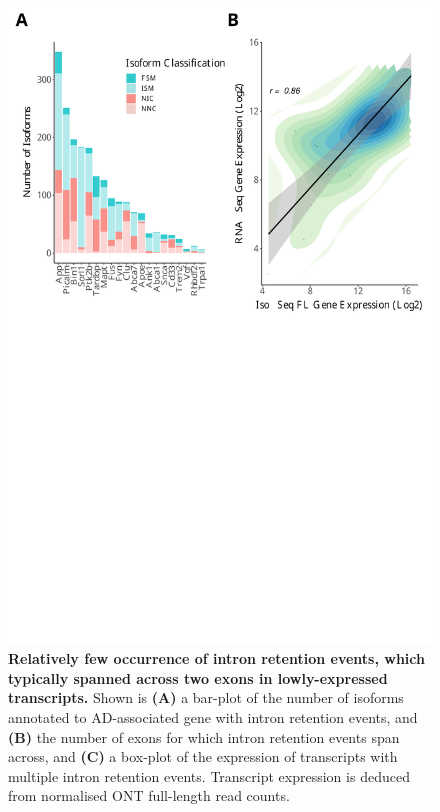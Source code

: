 \begin{figure}[]
	\centering
	\includegraphics[page=11,trim={0 0cm 0 0cm},clip,scale = 0.55]{Figures/ONTvsIsoSeq.pdf}
	\captionsetup{width=0.95\textwidth}
	\caption[Characterisation of intron retention events in AD-risk genes]%
	{\textbf{Relatively few occurrence of intron retention events, which typically spanned across two exons in lowly-expressed transcripts.} Shown is \textbf{(A)} a bar-plot of the number of isoforms annotated to AD-associated gene with intron retention events, and \textbf{(B)} the number of exons for which intron retention events span across, and \textbf{(C)} a box-plot of the expression of transcripts with multiple intron retention events. Transcript expression is deduced from normalised ONT full-length read counts.}
	\label{fig:IR_targeted}
\end{figure}
\restoregeometry

